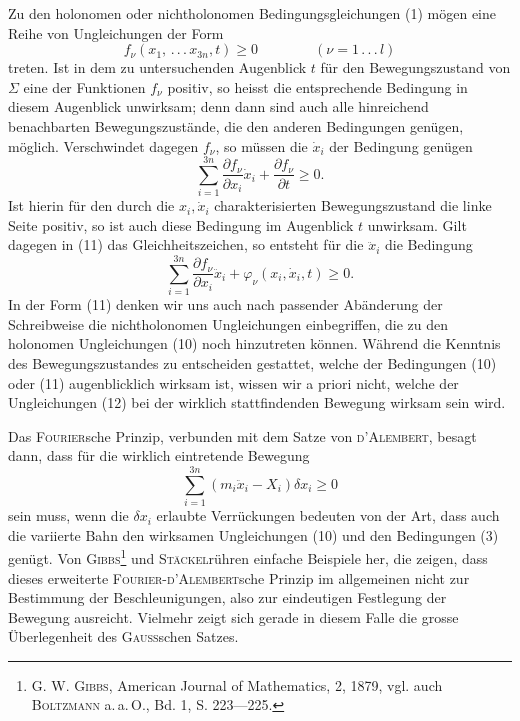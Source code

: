 Zu den holonomen oder nichtholonomen Bedingungsgleichungen (1) mögen
eine Reihe von Ungleichungen der Form
\[
f_\nu(x_1,\, .\, .\, .\, x_{3n},t)\geq0
\qquad\qquad(\nu=1\, .\, .\, .\, l)\tag{10}
\]
\noindent treten. Ist in dem zu untersuchenden Augenblick $t$ für den Bewegungszustand
von $\Sigma$ eine der Funktionen $f_\nu$ positiv, so heisst die entsprechende Bedingung
in diesem Augenblick unwirksam; denn dann sind auch alle hinreichend benachbarten
Bewegungszustände, die den anderen Bedingungen genügen, möglich.
\clearpage{}
\noindent Verschwindet dagegen $f_\nu$, so müssen die $\dot x_i$ der Bedingung genügen
\[
\sum_{i=1}^{3n}\frac{\partial f_\nu}{\partial x_i}\dot x_i+\frac{\partial f_\nu}{\partial t}\geq0.\tag{11}
\]
\noindent Ist hierin für den durch die $x_i,\dot x_i$ charakterisierten Bewegungszustand die linke
Seite positiv, so ist auch diese Bedingung im Augenblick $t$ unwirksam. Gilt
dagegen in (11) das Gleichheitszeichen, so entsteht für die $\ddot x_i$ die Bedingung
\[
\sum_{i=1}^{3n}\frac{\partial f_\nu}{\partial x_i}\ddot x_i+\varphi_\nu(x_i,\dot x_i,t)\geq0.\tag{12}
\]
\noindent In der Form (11) denken wir uns auch nach passender Abänderung der
Schreibweise die nichtholonomen Ungleichungen einbegriffen, die zu den holonomen
Ungleichungen (10) noch hinzutreten können. Während die Kenntnis
des Bewegungszustandes zu entscheiden gestattet, welche der Bedingungen (10)
oder (11) augenblicklich wirksam ist, wissen wir a priori nicht, welche der
Ungleichungen (12) bei der wirklich stattfindenden Bewegung wirksam sein wird.

Das \textsc{Fourier}sche Prinzip, verbunden mit dem Satze von \textsc{d’Alembert}, besagt
dann, dass für die wirklich eintretende Bewegung
\[
\sum_{i=1}^{3n}(m_i\ddot x_i-X_i)\delta x_i\geq0\tag{13}
\]
\noindent sein muss, wenn die $\delta x_i$ erlaubte Verrückungen bedeuten von der Art, dass auch
die variierte Bahn den wirksamen Ungleichungen (10) und den Bedingungen
(3) genügt. Von \textsc{Gibbs}\footnote{G. W. \textsc{Gibbs}, American Journal of Mathematics, 2, 1879, vgl. auch \textsc{Boltzmann} a.\,a.\,O., Bd. 1,
S. 223—225.} und \textsc{Stäckel}\footnotemark[44] rühren einfache Beispiele her, die
zeigen, dass dieses erweiterte \textsc{Fourier-d’Alembert}sche Prinzip im allgemeinen
nicht zur Bestimmung der Beschleunigungen, also zur eindeutigen Festlegung
der Bewegung ausreicht. Vielmehr zeigt sich gerade in diesem Falle die
grosse Überlegenheit des \textsc{Gauss}schen Satzes.

